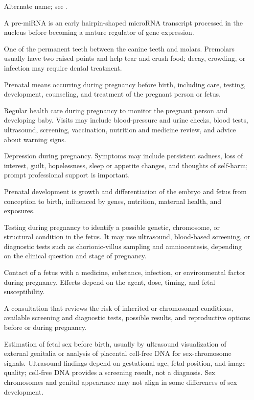  Alternate name; see .

 A pre-miRNA is an early hairpin-shaped microRNA transcript processed in the nucleus before becoming a mature regulator of gene expression.

 One of the permanent teeth between the canine teeth and molars. Premolars usually have two raised points and help tear and crush food; decay, crowding, or infection may require dental treatment.

 Prenatal means occurring during pregnancy before birth, including care, testing, development, counseling, and treatment of the pregnant person or fetus.

 Regular health care during pregnancy to monitor the pregnant person and developing baby. Visits may include blood-pressure and urine checks, blood tests, ultrasound, screening, vaccination, nutrition and medicine review, and advice about warning signs.

 Depression during pregnancy. Symptoms may include persistent sadness, loss of interest, guilt, hopelessness, sleep or appetite changes, and thoughts of self-harm; prompt professional support is important.

 Prenatal development is growth and differentiation of the embryo and fetus from conception to birth, influenced by genes, nutrition, maternal health, and exposures.

 Testing during pregnancy to identify a possible genetic, chromosome, or structural condition in the fetus. It may use ultrasound, blood-based screening, or diagnostic tests such as chorionic-villus sampling and amniocentesis, depending on the clinical question and stage of pregnancy.

 Contact of a fetus with a medicine, substance, infection, or environmental factor during pregnancy.
Effects depend on the agent, dose, timing, and fetal susceptibility.

 A consultation that reviews the risk of inherited or chromosomal conditions, available screening and diagnostic tests, possible results, and reproductive options before or during pregnancy.

 Estimation of fetal sex before birth, usually by
ultrasound visualization of external genitalia or analysis of placental cell-free DNA for
sex-chromosome signals. Ultrasound findings depend on gestational age, fetal position, and
image quality; cell-free DNA provides a screening result, not a diagnosis. Sex chromosomes
and genital appearance may not align in some differences of sex development.

